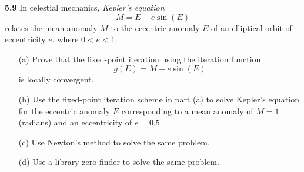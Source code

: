 \textbf{5.9} In celestial mechanics,
\emph{Kepler's equation}
\begin{displaymath}
  M = E - e\sin(E)
\end{displaymath}
relates the mean anomaly $M$ to the eccentric anomaly $E$ of an elliptical orbit
of eccentricity $e$,
where $0<e<1$.
\begin{itemize}
\item[(a)]
  Prove that the fixed-point iteration using the iteration function
  \begin{displaymath}
    g(E) = M + e\sin(E)
  \end{displaymath}
  is locally convergent.

\item[(b)]
  Use the fixed-point iteration scheme in part (a)
  to solve Kepler's equation for the eccentric anomaly $E$
  corresponding to a mean anomaly of $M=1$ (radians)
  and an eccentricity of $e=0.5$.

\item[(c)]
  Use Newton's method to solve the same problem.

\item[(d)]
  Use a library zero finder to solve the same problem.
\end{itemize}

